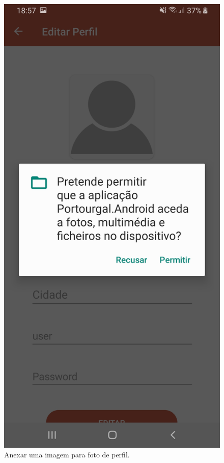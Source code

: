 \begin{figure}[H]
\centering
\includegraphics[width=0.5\linewidth]{images/anexarImagem.jpg}
\caption{Anexar uma imagem para foto de perfil.}
\end{figure}